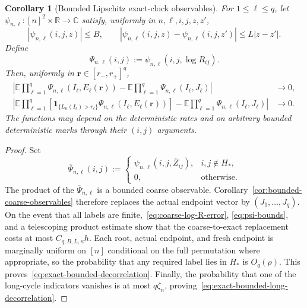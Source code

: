 \documentclass[11pt]{article}
\newcommand{\E}{\mathbb E}
\newcommand{\1}{\mathbf 1}
\newcommand{\R}{\mathbb R}
\newtheorem{corollary}[theorem]{Corollary}
\theoremstyle{definition}
\theoremstyle{remark}
\begin{document}
\begin{corollary}[Bounded Lipschitz exact-clock observables]
\label{cor:bounded-exact-observables}
For $1\leq\ell\leq q$, let
$\psi_{n,\ell}:[n]^2\times\R\to\mathbb C$ satisfy, uniformly in
$n,\ell,i,j,z,z'$,
\begin{equation}\label{eq:psi-bounds}
 |\psi_{n,\ell}(i,j,z)|\leq B,
 \qquad
 |\psi_{n,\ell}(i,j,z)-\psi_{n,\ell}(i,j,z')|
 \leq L|z-z'|.
\end{equation}
Define
\[
 \Psi_{n,\ell}(i,j)
 :=\psi_{n,\ell}(i,j,\log R_{ij}).
\]
Then, uniformly in $\mathbf r\in[r_-,r_+]^q$,
\begin{align}
 \left|
 \E\prod_{\ell=1}^q\Psi_{n,\ell}(I_\ell,E_\ell(\mathbf r))
 -\E\prod_{\ell=1}^q\Psi_{n,\ell}(I_\ell,J_\ell)
 \right|
 &\longrightarrow0,
 \label{eq:exact-bounded-decorrelation}\\
 \left|
 \E\prod_{\ell=1}^q
 \left[
  \1_{\{L_n(I_\ell)>r_\ell\}}
  \Psi_{n,\ell}(I_\ell,E_\ell(\mathbf r))
 \right]
 -\E\prod_{\ell=1}^q\Psi_{n,\ell}(I_\ell,J_\ell)
 \right|
 &\longrightarrow0.
 \label{eq:exact-bounded-long-decorrelation}
\end{align}
The functions may depend on the deterministic rates and on arbitrary
bounded deterministic marks through their $(i,j)$ arguments.
\end{corollary}

\begin{proof}
Set
\[
 \overline\Psi_{n,\ell}(i,j)
 :=
 \begin{cases}
  \psi_{n,\ell}(i,j,\overline Z_{ij}),&i,j\notin H_*,\\
  0,&\text{otherwise}.
 \end{cases}
\]
The product of the $\overline\Psi_{n,\ell}$ is a bounded coarse
observable.  Corollary~\ref{cor:bounded-coarse-observables} therefore
replaces the actual endpoint vector by $(J_1,\dots,J_q)$.  On the event
that all labels are finite,~\eqref{eq:coarse-log-R-error},
\eqref{eq:psi-bounds}, and a telescoping product estimate show that the
coarse-to-exact replacement costs at most $C_{q,B,L,\kappa}h$.
Each root, actual endpoint, and fresh endpoint is marginally uniform on
$[n]$ conditional on the full permutation where appropriate, so the
probability that any required label lies in $H_*$ is $O_q(\rho)$.
This proves~\eqref{eq:exact-bounded-decorrelation}.  Finally, the
probability that one of the long-cycle indicators vanishes is at most
$q\zeta_n$, proving~\eqref{eq:exact-bounded-long-decorrelation}.
\end{proof}
\end{document}
